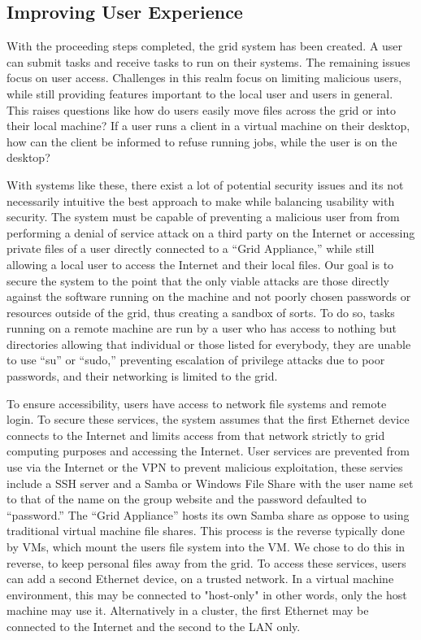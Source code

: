 \documentclass[conference]{IEEEtran}
\begin{document}
\subsection{Improving User Experience}

With the proceeding steps completed, the grid system has been created.  A user
can submit tasks and receive tasks to run on their systems.  The remaining
issues focus on user access.  Challenges in this realm focus on limiting
malicious users, while still providing features important to the local user and
users in general.  This raises questions like how do users easily move files
across the grid or into their local machine?  If a user runs a client in a
virtual machine on their desktop, how can the client be informed to refuse
running jobs, while the user is on the desktop?

With systems like these, there exist a lot of potential security issues and its
not necessarily intuitive the best approach to make while balancing usability
with security.  The system must be capable of preventing a malicious user from
from performing a denial of service attack on a third party on the Internet or
accessing private files of a user directly connected to a ``Grid Appliance,''
while still allowing a local user to access the Internet and their local files.
Our goal is to secure the system to the point that the only viable attacks are
those directly against the software running on the machine and not poorly
chosen passwords or resources outside of the grid, thus creating a sandbox of
sorts.  To do so, tasks running on a remote machine are run by a user who has
access to nothing but directories allowing that individual or those listed for
everybody, they are unable to use ``su'' or ``sudo,'' preventing escalation of
privilege attacks due to poor passwords, and their networking is limited to the
grid.

To ensure accessibility, users have access to network file systems and remote
login.  To secure these services, the system assumes that the first Ethernet
device connects to the Internet and limits access from that network strictly to
grid computing purposes and accessing the Internet.  User services are
prevented from use via the Internet or the VPN to prevent malicious
exploitation, these servies include a SSH server and a Samba or Windows File
Share with the user name set to that of the name on the group website and the
password defaulted to ``password.'' The ``Grid Appliance'' hosts its own Samba
share as oppose to using traditional virtual machine file shares.  This process
is the reverse typically done by VMs, which mount the users file system into
the VM.  We chose to do this in reverse, to keep personal files away from the
grid.  To access these services, users can add a second Ethernet device, on a
trusted network.  In a virtual machine environment, this may be connected to
"host-only" in other words, only the host machine may use it.  Alternatively in
a cluster, the first Ethernet may be connected to the Internet and the second
to the LAN only.
\end{document}
